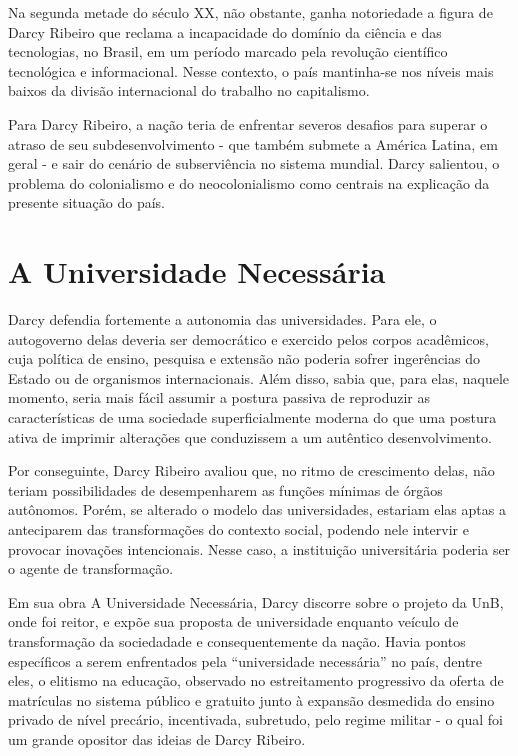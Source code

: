 \documentclass{sbrt}
\begin{document}
Na segunda metade do século XX, não obstante, ganha notoriedade a figura de Darcy Ribeiro que reclama a incapacidade do domínio da ciência e das tecnologias, no Brasil, em um período marcado pela revolução científico tecnológica e informacional. Nesse contexto, o país mantinha-se nos níveis mais baixos da divisão internacional do trabalho no capitalismo.

Para Darcy Ribeiro, a nação teria de enfrentar severos desafios para superar o atraso de seu subdesenvolvimento - que também submete a América Latina, em geral - e sair do cenário de subserviência no sistema mundial. Darcy salientou, o problema do colonialismo e do neocolonialismo como centrais na explicação da presente situação do país.

\section{A Universidade Necessária}

Darcy defendia fortemente a autonomia das universidades. Para ele, o autogoverno delas deveria ser democrático e exercido pelos corpos acadêmicos, cuja política de ensino, pesquisa e extensão não poderia sofrer ingerências do Estado ou de organismos internacionais. Além disso, sabia que, para elas, naquele momento, seria mais fácil assumir a postura passiva de reproduzir as características de uma sociedade superficialmente moderna do que uma postura ativa de imprimir alterações que conduzissem a um autêntico desenvolvimento.

Por conseguinte, Darcy Ribeiro avaliou que, no ritmo de crescimento delas, não teriam possibilidades de desempenharem as funções mínimas de órgãos autônomos. Porém, se alterado o modelo das universidades, estariam elas aptas a anteciparem das transformações do contexto social, podendo nele intervir e provocar inovações intencionais. Nesse caso, a instituição universitária poderia ser o agente de transformação.

Em sua obra A Universidade Necessária, Darcy discorre sobre o projeto da UnB, onde foi reitor, e expõe sua proposta de universidade enquanto veículo de transformação da sociedadade e consequentemente da nação. Havia pontos específicos a serem enfrentados pela “universidade necessária” no país, dentre eles, o elitismo na educação, observado no estreitamento progressivo da oferta de matrículas no sistema público e gratuito junto à expansão desmedida do ensino privado de nível precário, incentivada, subretudo, pelo regime militar - o qual foi um grande opositor das ideias de Darcy Ribeiro.
\end{document}
